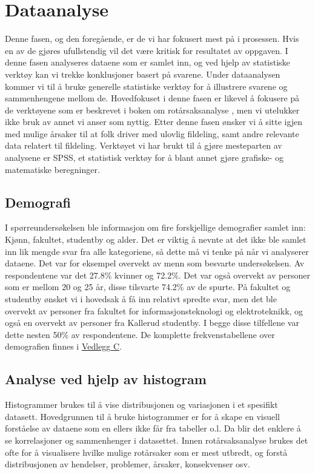 \chapter{Dataanalyse}
Denne fasen, og den foregående, er de vi har fokusert mest på i prosessen. Hvis en av de gjøres ufullstendig vil det være kritisk for resultatet av oppgaven. I denne fasen analyseres dataene som er samlet inn, og ved hjelp av statistiske verktøy kan vi trekke konklusjoner basert på svarene. Under dataanalysen kommer vi til å bruke generelle statistiske verktøy for å illustrere svarene og sammenhengene mellom de. Hovedfokuset i denne fasen er likevel å fokusere på de verktøyene som er beskrevet i boken om rotårsaksanalyse \cite{RCA}, men vi utelukker ikke bruk av annet vi anser som nyttig. Etter denne fasen ønsker vi å sitte igjen med mulige årsaker til at folk driver med ulovlig fildeling, samt andre relevante data relatert til fildeling. Verktøyet vi har brukt til å gjøre mesteparten av analysene er SPSS, et statistisk verktøy for å blant annet gjøre grafiske- og matematiske beregninger.

\section{Demografi}
I spørreundersøkelsen ble informasjon om fire forskjellige demografier samlet inn: Kjønn, fakultet, studentby og alder. Det er viktig å nevnte at det ikke ble samlet inn lik mengde svar fra alle kategoriene, så dette må vi tenke på når vi analyserer dataene. Det var for eksempel overvekt av menn som besvarte undersøkelsen. Av respondentene var det 27.8\% kvinner og 72.2\%. Det var også overvekt av personer som er mellom 20 og 25 år, disse tilsvarte 74.2\% av de spurte. På fakultet og studentby ønsket vi i hovedsak å få inn relativt spredte svar, men det ble overvekt av personer fra fakultet for informasjonsteknologi og elektroteknikk, og også en overvekt av personer fra Kallerud studentby. I begge disse tilfellene var dette nesten 50\% av respondentene. De komplette frekvenstabellene over demografien finnes i \hyperref[frekvens]{Vedlegg C}.

\section{Analyse ved hjelp av histogram}
Histogrammer brukes til å vise distribusjonen og variasjonen i et spesifikt datasett. Hovedgrunnen til å bruke histogrammer er for å skape en visuell forståelse av dataene som en ellers ikke får fra tabeller o.l. Da blir det enklere å se korrelasjoner og sammenhenger i datasettet. Innen rotårsaksanalyse brukes det ofte for å visualisere hvilke mulige rotårsaker som er mest utbredt, og forstå distribusjonen av hendelser, problemer, årsaker, konsekvenser osv. \cite{RCA}

